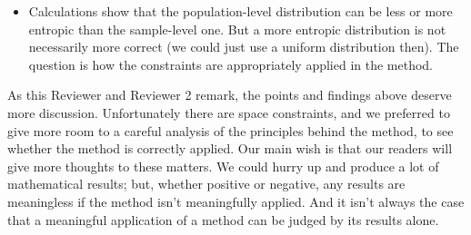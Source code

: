 \documentclass{article}
\begin{document}
\begin{enumerate}
\begin{itemize}
\item Calculations show that the population-level distribution can be less
  or more entropic than the sample-level one. But a more entropic
  distribution is not necessarily more correct (we could just use a uniform
  distribution then). The question is how the constraints are appropriately
  applied in the method. 
\end{itemize}
As this Reviewer and Reviewer 2 remark, the points and findings above
deserve more discussion. Unfortunately there are space constraints, and we
preferred to give more room to a careful analysis of the principles behind
the method, to see whether the method is correctly applied. Our main wish
is that our readers will give more thoughts to these matters. We could
hurry up and produce a lot of mathematical results; but, whether positive
or negative, any results are meaningless if the method isn't meaningfully
applied. And it isn't always the case that a meaningful application of a
method can be judged by its results alone.
\end{enumerate}
\end{document}
